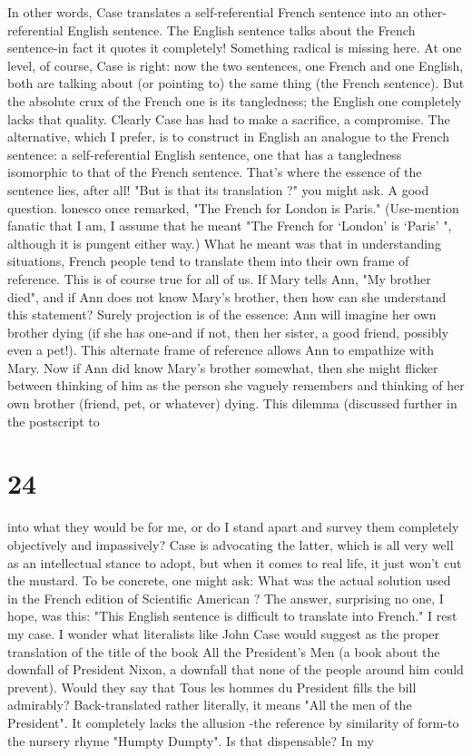 In other words, Case translates a self-referential French sentence into an other- referential English sentence. The English sentence talks about the French sentence-in fact it quotes it completely! Something radical is missing here. At one level, of course, Case is right: now the two sentences, one French and one English, both are talking about (or pointing to) the same thing (the French sentence). But the absolute crux of the French one is its tangledness; the English one completely lacks that quality. Clearly Case has had to make a sacrifice, a compromise. The alternative, which I prefer, is to construct in English an analogue to the French sentence: a self-referential English sentence, one that has a tangledness isomorphic to that of the French sentence. That's where the essence of the sentence lies, after all! "But is that its translation ?" you might ask. A good question. lonesco once remarked, "The French for London is Paris." (Use-mention fanatic that I am, I assume that he meant "The French for `London' is `Paris' ", although it is pungent either way.) What he meant was that in understanding situations, French people tend to translate them into their own frame of reference. This is of course true for all of us. If Mary tells Ann, "My brother died", and if Ann does not know Mary's brother, then how can she understand this statement? Surely projection is of the essence: Ann will imagine her own brother dying (if she has one-and if not, then her sister, a good friend, possibly even a pet!). This alternate frame of reference allows Ann to empathize with Mary. Now if Ann did know Mary's brother somewhat, then she might flicker between thinking of him as the person she vaguely remembers and thinking of her own brother (friend, pet, or whatever) dying. This dilemma (discussed further in the postscript to \chapter {24}
into what they would be for me, or do I stand apart and survey them completely objectively and impassively? Case is advocating the latter, which is all very well as an intellectual stance to adopt, but when it comes to real life, it just won't cut the mustard. To be concrete, one might ask: What was the actual solution used in the French edition of Scientific American ? The answer, surprising no one, I hope, was this: "This English sentence is difficult to translate into French." I rest my case. 
\separator
I wonder what literalists like John Case would suggest as the proper translation of the title of the book All the President's Men (a book about the downfall of President Nixon, a downfall that none of the people around him could prevent). Would they say that Tous les hommes du President fills the bill admirably? Back-translated rather literally, it means "All the men of the President". It completely lacks the allusion -the reference by similarity of form-to the nursery rhyme "Humpty Dumpty". Is that dispensable? In my 



